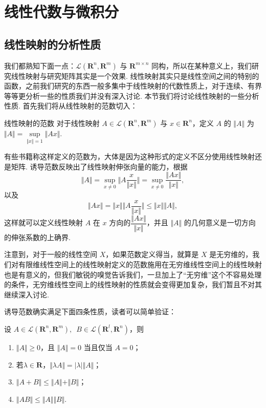 \chapter{线性代数与微积分}

\section{线性映射的分析性质}


我们都熟知下面一点：$\mathcal{L}(\mathbf{R}^n, \mathbf{R}^m)$ 与 $\mathbf{R}^{m\times n}$ 同构，所以在某种意义上，我们研究线性映射与研究矩阵其实是一个效果. 线性映射其实只是线性空间之间的特别的函数，之前我们研究的东西一般多集中于线性映射的代数性质上，对于连续、有界等等更分析一些的性质我们并没有深入讨论. 本节我们将讨论线性映射的一些分析性质. 首先我们将从线性映射的范数切入：

\begin{definition}{线性映射的范数}{}
    对于线性映射 $A\in \mathcal{L}(\mathbf{R}^n, \mathbf{R}^m)$ 与 $x\in\mathbf{R}^n$，定义 $A$ 的 $\Vert A \Vert$ 为 $\Vert A \Vert = \sup\limits_{\Vert x\Vert =  1} \Vert Ax\Vert$.
\end{definition}

有些书籍称这样定义的范数为，大体是因为这种形式的定义不区分使用线性映射还是矩阵. 诱导范数反映出了线性映射伸张向量的能力，根据\[\Vert A\Vert = \sup\limits_{x\neq 0}\Vert A\frac{x}{\Vert x\Vert}\Vert = \sup\limits_{x\neq 0}\frac{\Vert Ax\Vert}{\Vert x\Vert},\]以及\[\Vert Ax\Vert = \Vert x\Vert \Vert A\frac{x}{\Vert x\Vert}\Vert \leqslant \Vert x\Vert \Vert A\Vert,\]这样就可以定义线性映射 $A$ 在 $x$ 方向的$\dfrac{\Vert Ax\Vert}{\Vert x\Vert}$，并且 $\Vert A\Vert$ 的几何意义是一切方向的伸张系数的上确界.

注意到，对于一般的线性空间 $X$，如果范数定义得当，就算是 $X$ 是无穷维的，我们对有限维线性空间上的线性映射定义的范数施用在无穷维线性空间上的线性映射也是有意义的，但我们敏锐的嗅觉告诉我们，一旦加上了“无穷维”这个不容易处理的条件，无穷维线性空间上的线性映射的性质就会变得更加复杂，我们暂且不对其继续深入讨论.

诱导范数确实满足下面四条性质，读者可以简单验证：

\begin{theorem}{}{}
    设 $A\in \mathcal{L}(\mathbf{R}^n, \mathbf{R}^m),\enspace B\in \mathcal{L}(\mathbf{R}^l, \mathbf{R}^n)$，则
    \begin{enumerate}
        \item $\Vert A\Vert\geqslant 0$，且 $\Vert A\Vert=0$ 当且仅当 $A=0$；
        \item 若$\lambda\in \mathbf{R}$，$\Vert \lambda A\Vert = \vert\lambda\vert \Vert A\Vert$；
        \item $\Vert A+B\Vert\leqslant\Vert A\Vert+\Vert B\Vert$；
        \item $\Vert AB\Vert\leqslant\Vert A\Vert\Vert B\Vert$.
    \end{enumerate}
\end{theorem}

